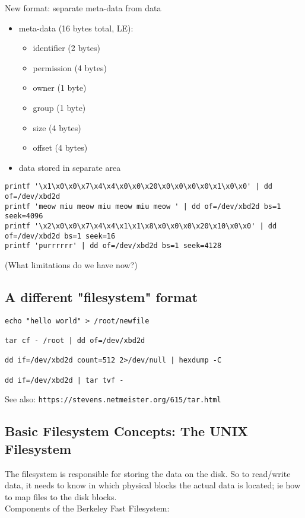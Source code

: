 \documentclass[xga]{xdvislides}
\begin{document}
New format: separate meta-data from data
\begin{itemize}
	\item meta-data (16 bytes total, LE):
		\begin{itemize}
			\item identifier (2 bytes)
			\item permission (4 bytes)
			\item owner (1 byte)
			\item group (1 byte)
			\item size (4 bytes)
			\item offset (4 bytes)
		\end{itemize}
	\item data stored in separate area
\end{itemize}
\smallish
\begin{verbatim}
printf '\x1\x0\x0\x7\x4\x4\x0\x0\x20\x0\x0\x0\x0\x1\x0\x0' | dd of=/dev/xbd2d
printf 'meow miu meow miu meow miu meow ' | dd of=/dev/xbd2d bs=1 seek=4096
printf '\x2\x0\x0\x7\x4\x4\x1\x1\x8\x0\x0\x0\x20\x10\x0\x0' | dd of=/dev/xbd2d bs=1 seek=16
printf 'purrrrrr' | dd of=/dev/xbd2d bs=1 seek=4128
\end{verbatim}
\Normalsize
(What limitations do we have now?)

\subsection{A different "filesystem" format}
\begin{verbatim}
echo "hello world" > /root/newfile

tar cf - /root | dd of=/dev/xbd2d

dd if=/dev/xbd2d count=512 2>/dev/null | hexdump -C

dd if=/dev/xbd2d | tar tvf -
\end{verbatim}
\vspace{1in}
See also: \verb+https://stevens.netmeister.org/615/tar.html+

\subsection{Basic Filesystem Concepts: The UNIX Filesystem}
The filesystem is responsible for storing the data on the disk.
So to read/write data, it needs to know in which physical blocks the actual
data is located; ie how to map files to the disk blocks.
\\

Components of the Berkeley Fast Filesystem:
\\
\end{document}
